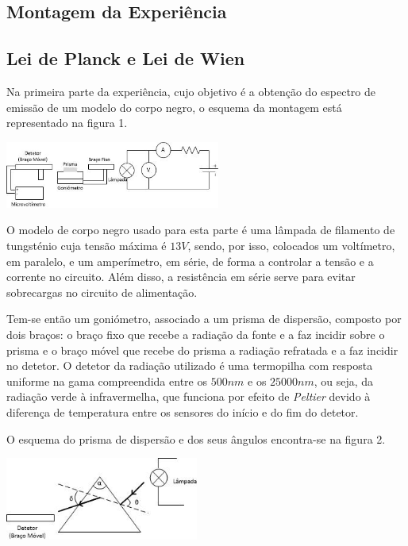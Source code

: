 \documentclass[9pt]{extarticle}
\begin{document}
\begin{multicols}{2}
\section{Montagem da Experiência}
\subsection{Lei de Planck e Lei de Wien}
\par Na primeira parte da experiência, cujo objetivo é a obtenção do espectro de emissão de um modelo do corpo negro, o esquema da montagem está representado na figura 1.

\begin{center}
\includegraphics[width=200pt]{parte1.jpg}
\begin{center}
\par{}
\end{center}
\end{center}

\par O modelo de corpo negro usado para esta parte é uma lâmpada de filamento de tungsténio cuja tensão máxima é $13 V$, sendo, por isso, colocados um voltímetro, em paralelo, e um amperímetro, em série, de forma a controlar a tensão e a corrente no circuito. Além disso, a resistência em série serve para evitar sobrecargas no circuito de alimentação.

\par Tem-se então um goniómetro, associado a um prisma de dispersão, composto por dois braços: o braço fixo que recebe a radiação da fonte e a faz incidir sobre o prisma e o braço móvel que recebe do prisma a radiação refratada e a faz incidir no detetor. O detetor da radiação utilizado é uma termopilha com resposta uniforme na gama compreendida entre os $500 nm$ e os $25000 nm$, ou seja, da radiação verde à infravermelha, que funciona por efeito de \textit{Peltier} devido à diferença de temperatura entre os sensores do início e do fim do detetor.
\par O esquema do prisma de dispersão e dos seus ângulos encontra-se na figura 2.

\begin{center}
\includegraphics[width=180pt]{prisma.jpg}
\begin{center}
\par{}
\end{center}
\end{center}


\end{multicols}
\end{document}
